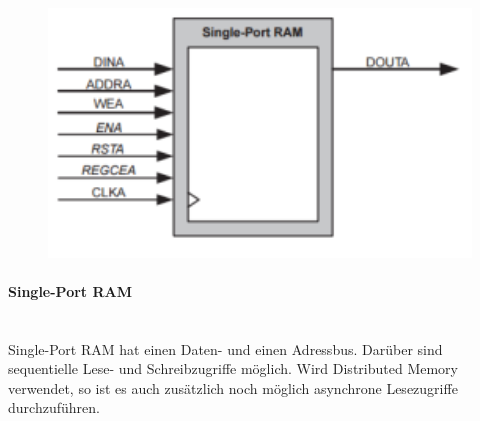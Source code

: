\begin{minipage}{0.3\textwidth}
    \begin{figure}[H]
        \includegraphics[width=1\textwidth]{images/singleportram.png}
    \end{figure}
\end{minipage}
\hfill
\begin{minipage}{0.65\textwidth}
    \paragraph{Single-Port RAM}$~$ \\
    Single-Port RAM hat einen Daten- und einen Adressbus. Darüber sind sequentielle Lese- und Schreibzugriffe möglich. Wird Distributed Memory verwendet, so ist es auch zusätzlich noch möglich asynchrone Lesezugriffe durchzuführen. \ \\ \ \\ \ \\
\end{minipage}

